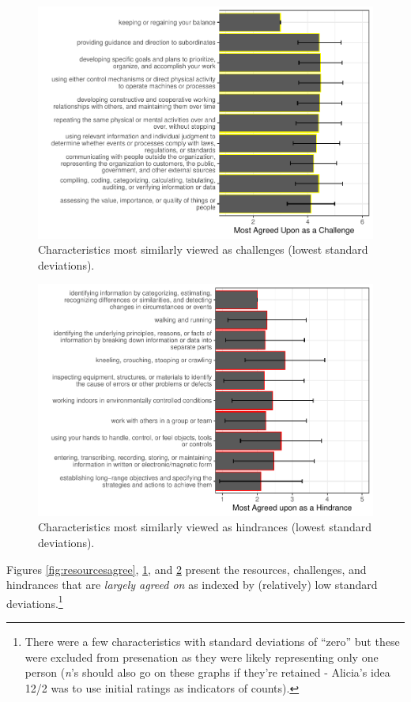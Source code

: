 \documentclass[
  english,
  man]{apa6}
\begin{document}
\begin{figure}
\centering
\includegraphics{Submission_files/figure-latex/challengesagree-1.pdf}
\caption{\label{fig:challengesagree}Characteristics most similarly viewed as challenges (lowest standard deviations).}
\end{figure}

\begin{figure}
\centering
\includegraphics{Submission_files/figure-latex/hindrancesagree-1.pdf}
\caption{\label{fig:hindrancesagree}Characteristics most similarly viewed as hindrances (lowest standard deviations).}
\end{figure}

Figures \ref{fig:resourcesagree}, \ref{fig:challengesagree}, and \ref{fig:hindrancesagree} present the resources, challenges, and hindrances that are \emph{largely agreed on} as indexed by (relatively) low standard deviations.\footnote{There were a few characteristics with standard deviations of ``zero'' but these were excluded from presenation as they were likely representing only one person (\emph{n}'s should also go on these graphs if they're retained - Alicia's idea 12/2 was to use initial ratings as indicators of counts).}
\end{document}
